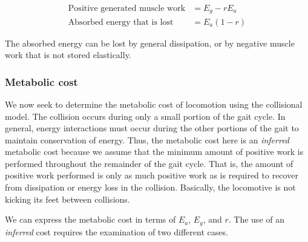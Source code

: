 \begin{align}
\mbox{Positive generated muscle work} &= E_{g} - rE_{a} \\
\mbox{Absorbed energy that is lost} &= E_{a}(1-r)
\label{eq:ElasticRecovery}
\end{align}

The absorbed energy can be lost by general dissipation, or by negative muscle work that is not stored elastically.

\subsubsection*{Metabolic cost}

We now seek to determine the metabolic cost of locomotion using the collisional model. The collision occurs during only a small portion of the gait cycle. In general, energy interactions must occur during the other portions of the gait to maintain conservation of energy. Thus, the metabolic cost here is an \textit{inferred} metabolic cost  because we assume that the minimum amount of positive work is performed throughout the remainder of the gait cycle. That is, the amount of positive work performed is only as much positive work as is required to recover from dissipation or energy loss in the collision. Basically, the locomotive is not kicking its feet between collisions.

We can express the metabolic cost in terms of $E_{a}$, $E_{g}$, and $r$. The use of an \textit{inferred} cost requires the examination of two different cases.

